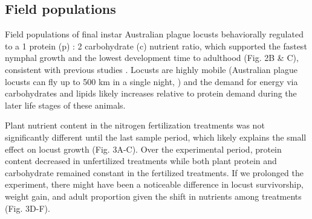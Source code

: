 \documentclass[
]{article}
\begin{document}
\subsection{Field populations}\label{field-populations}

Field populations of final instar Australian plague locusts behaviorally
regulated to a 1 protein (p) : 2 carbohydrate (c) nutrient ratio, which
supported the fastest nymphal growth and the lowest development time to
adulthood (Fig. 2B \& C), consistent with previous studies
\citep{clissold_regulation_2014, lawton_mismatched_2021}. Locusts are
highly mobile (Australian plague locusts can fly up to 500 km in a
single night, \citep{deveson_not_2005}) and the demand for energy via
carbohydrates and lipids likely increases relative to protein demand
during the later life stages of these animals.

Plant nutrient content in the nitrogen fertilization treatments was not
significantly different until the last sample period, which likely
explains the small effect on locust growth (Fig. 3A-C). Over the
experimental period, protein content decreased in unfertilized
treatments while both plant protein and carbohydrate remained constant
in the fertilized treatments. If we prolonged the experiment, there
might have been a noticeable difference in locust survivorship, weight
gain, and adult proportion given the shift in nutrients among treatments
(Fig. 3D-F).
\end{document}
